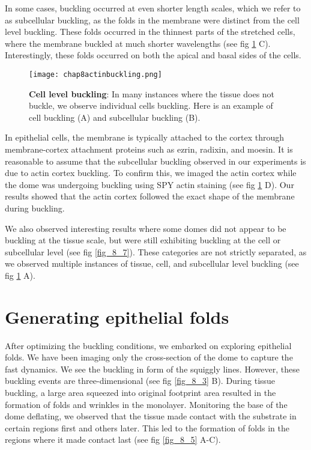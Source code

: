 In some cases, buckling occurred at even shorter length scales, which we refer to as subcellular buckling, as the folds in the membrane were distinct from the cell level buckling. These folds occurred in the thinnest parts of the stretched cells, where the membrane buckled at much shorter wavelengths (see fig \ref{fig_8_6} C). Interestingly, these folds occurred on both the apical and basal sides of the cells.

\begin{figure}[h!]
	\centering
	\texttt{[image: chap8actinbuckling.png]}
	\caption{\label{fig_8_6} \textbf{Cell level buckling}: In many instances where the tissue does not buckle, we observe individual cells buckling. Here is an example of cell buckling (A) and subcellular buckling (B).}
\end{figure}

In epithelial cells, the membrane is typically attached to the cortex through membrane-cortex attachment proteins such as ezrin, radixin, and moesin. It is reasonable to assume that the subcellular buckling observed in our experiments is due to actin cortex buckling. To confirm this, we imaged the actin cortex while the dome was undergoing buckling using SPY actin staining (see fig \ref{fig_8_6} D). Our results showed that the actin cortex followed the exact shape of the membrane during buckling.

We also observed interesting results where some domes did not appear to be buckling at the tissue scale, but were still exhibiting buckling at the cell or subcellular level (see fig \ref{fig_8_7}). These categories are not strictly separated, as we observed multiple instances of tissue, cell, and subcellular level buckling (see fig \ref{fig_8_6} A).


\hypertarget{generating-epithelial-folds}{%
	\section{Generating epithelial
		folds}\label{generating-epithelial-folds}}

After optimizing the buckling conditions, we embarked on exploring epithelial folds. We have been imaging only the cross-section of the dome to capture the fast dynamics. We see the buckling in form of the squiggly lines. However, these buckling events are three-dimensional (see fig \ref{fig_8_3} B). During tissue buckling, a large area squeezed into original footprint area resulted in the formation of folds and wrinkles in the monolayer. Monitoring the base of the dome deflating, we observed that the tissue made contact with the substrate in certain regions first and others later. This led to the formation of folds in the regions where it made contact last (see fig \ref{fig_8_5} A-C).

